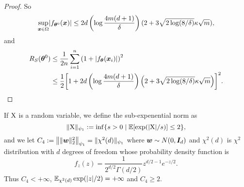 \documentclass{article}
\begin{document}
\begin{proof}
    So
    \begin{equation}
        \sup_{\bm{x}\in\Omega}\lvert f_{\bm{\theta}^0}(\bm{x})\rvert\leq 2d\left(\log\frac{4m(d+1)}{\delta}\right)(2+3\sqrt{2\log(8/\delta)}\kappa\sqrt{m}),
    \end{equation}
    and
    \begin{equation}
        \begin{aligned}
            R_S(\bm{\theta}^0)
             & \leq\frac{1}{2n}\sum_{i=1}^n{\left(1+\lvert f_{\bm{\theta}}(\bm{x}_i)\rvert\right)}^2                                                          \\
             & \leq\frac{1}{2}{\left[1+2d\left(\log\frac{4m(d+1)}{\delta}\right)\left(2+3\sqrt{2\log(8/\delta)}\kappa\sqrt{m}\right)\right]}^2.
        \end{aligned}
    \end{equation}
\end{proof}
\begin{defi}
    If $\textnormal{X}$ is a random variable, we define the sub-expenential norm as
    \begin{equation}
        \lVert\textnormal{X}\rVert_{\psi_1} := \inf\{s>0 \mid \mathbb{E}[\exp(\lvert\textnormal{X}\rvert/s)]\leq 2\},
    \end{equation}
    and we let $C_4:=\left\lVert\lVert\bm{w}\rVert_2^2\right\rVert_{\psi_1} = \lVert\chi^2(d)\rVert_{\psi_1}$ where $\bm{w}\sim N(0,\bm{I}_d)$ and $\chi^2(d)$ is $\chi^2$ distribution with $d$ degrees of freedom whose probability density function is
    \begin{equation}
        f_z(z)=\frac{1}{2^{d/2}\Gamma(d/2)}z^{d/2-1}e^{-z/2}.
    \end{equation}
    Thus $C_{4}<+\infty$, $\mathbb{E}_{\chi^2(d)}\exp(\lvert z\rvert/2)=+\infty$ and $C_{4}\geq 2$.
\end{defi}
\end{document}
